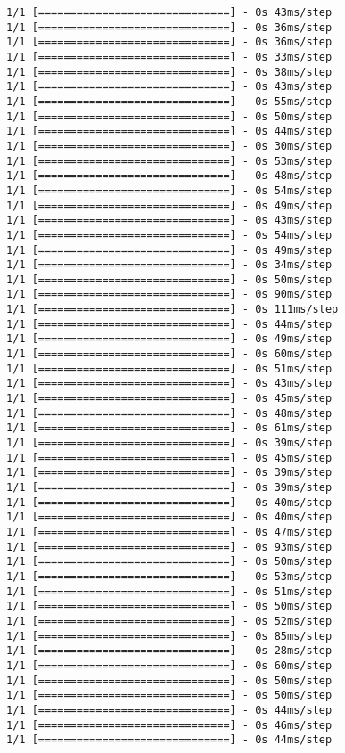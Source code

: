 \documentclass[11pt]{article}
\begin{document}
\begin{Verbatim}[commandchars=\\\{\}]
1/1 [==============================] - 0s 43ms/step
1/1 [==============================] - 0s 36ms/step
1/1 [==============================] - 0s 36ms/step
1/1 [==============================] - 0s 33ms/step
1/1 [==============================] - 0s 38ms/step
1/1 [==============================] - 0s 43ms/step
1/1 [==============================] - 0s 55ms/step
1/1 [==============================] - 0s 50ms/step
1/1 [==============================] - 0s 44ms/step
1/1 [==============================] - 0s 30ms/step
1/1 [==============================] - 0s 53ms/step
1/1 [==============================] - 0s 48ms/step
1/1 [==============================] - 0s 54ms/step
1/1 [==============================] - 0s 49ms/step
1/1 [==============================] - 0s 43ms/step
1/1 [==============================] - 0s 54ms/step
1/1 [==============================] - 0s 49ms/step
1/1 [==============================] - 0s 34ms/step
1/1 [==============================] - 0s 50ms/step
1/1 [==============================] - 0s 90ms/step
1/1 [==============================] - 0s 111ms/step
1/1 [==============================] - 0s 44ms/step
1/1 [==============================] - 0s 49ms/step
1/1 [==============================] - 0s 60ms/step
1/1 [==============================] - 0s 51ms/step
1/1 [==============================] - 0s 43ms/step
1/1 [==============================] - 0s 45ms/step
1/1 [==============================] - 0s 48ms/step
1/1 [==============================] - 0s 61ms/step
1/1 [==============================] - 0s 39ms/step
1/1 [==============================] - 0s 45ms/step
1/1 [==============================] - 0s 39ms/step
1/1 [==============================] - 0s 39ms/step
1/1 [==============================] - 0s 40ms/step
1/1 [==============================] - 0s 40ms/step
1/1 [==============================] - 0s 47ms/step
1/1 [==============================] - 0s 93ms/step
1/1 [==============================] - 0s 50ms/step
1/1 [==============================] - 0s 53ms/step
1/1 [==============================] - 0s 51ms/step
1/1 [==============================] - 0s 50ms/step
1/1 [==============================] - 0s 52ms/step
1/1 [==============================] - 0s 85ms/step
1/1 [==============================] - 0s 28ms/step
1/1 [==============================] - 0s 60ms/step
1/1 [==============================] - 0s 50ms/step
1/1 [==============================] - 0s 50ms/step
1/1 [==============================] - 0s 44ms/step
1/1 [==============================] - 0s 46ms/step
1/1 [==============================] - 0s 44ms/step

\end{Verbatim}
\end{document}
